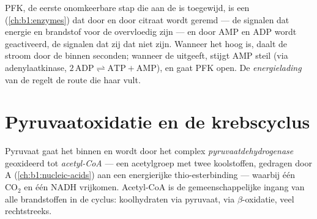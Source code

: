 \begin{proposition}\label{prop:b1:respiration-fermentation:pfk}
PFK, de eerste onomkeerbare stap die aan de  is toegewijd, is een
 (\cref{ch:b1:enzymes}) dat door  en door citraat wordt geremd
--- de signalen dat energie en brandstof voor de  overvloedig zijn ---
en door AMP en ADP wordt geactiveerd, de signalen dat zij dat niet zijn. Wanneer
het  hoog is, daalt de stroom door de  binnen seconden; wanneer de 
 uitgeeft, stijgt AMP steil (via adenylaatkinase,
$2\,\mathrm{ADP} \rightleftharpoons \mathrm{ATP} + \mathrm{AMP}$), en gaat PFK
open. De \emph{energielading} van de  regelt de route die haar vult.
\end{proposition}

\section{Pyruvaatoxidatie en de krebscyclus}

\begin{definition}\label{def:b1:respiration-fermentation:pdh}
Pyruvaat gaat het  binnen en wordt door het complex
\emph{pyruvaatdehydrogenase} geoxideerd tot \emph{acetyl-CoA}
--- een acetylgroep met twee koolstoffen, gedragen door  A
(\cref{ch:b1:nucleic-acids}) aan een energierijke thio-esterbinding --- waarbij één
$\mathrm{CO_2}$ en één NADH vrijkomen. Acetyl-CoA is de gemeenschappelijke ingang
van alle brandstoffen in de cyclus: koolhydraten via pyruvaat,  via
$\beta$-oxidatie, veel  rechtstreeks.
\end{definition}


